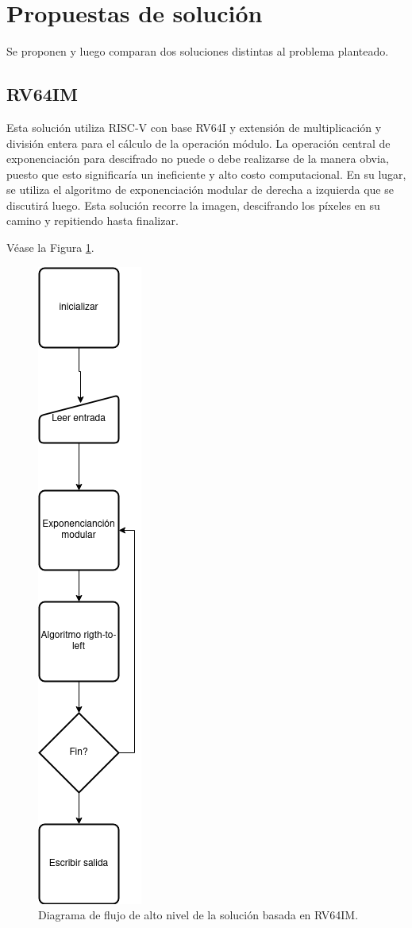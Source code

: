 \documentclass[conference, 14pt]{IEEEtran}
\begin{document}
\section{Propuestas de solución}

Se proponen y luego comparan dos soluciones distintas al problema planteado.

\subsection{RV64IM}

Esta solución utiliza RISC-V con base RV64I y extensión de multiplicación y
	  división entera para el cálculo de la operación módulo. La operación
	  central de exponenciación para descifrado no puede o debe realizarse de
	  la manera obvia, puesto que esto significaría un ineficiente y alto costo
	  computacional. En su lugar, se utiliza el algoritmo de exponenciación
	  modular de derecha a izquierda que se discutirá luego. Esta solución
	  recorre la imagen, descifrando los píxeles en su camino y repitiendo
	  hasta finalizar.

	  Véase la Figura \ref{fig:rv}.
	  \begin{figure}[H]
        \centering
		\caption{\label{fig:rv}Diagrama de flujo de alto nivel de la solución basada en RV64IM.}
		\includegraphics[width=.2\columnwidth]{diag-rv}
	  \end{figure}
\end{document}

